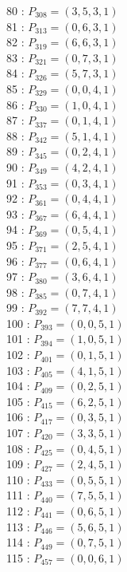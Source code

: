 \documentclass{article}
\begin{document}
{\begin{multicols}{3}
80 : $P_{308}=( 3, 5, 3, 1 )$\\
81 : $P_{313}=( 0, 6, 3, 1 )$\\
82 : $P_{319}=( 6, 6, 3, 1 )$\\
83 : $P_{321}=( 0, 7, 3, 1 )$\\
84 : $P_{326}=( 5, 7, 3, 1 )$\\
85 : $P_{329}=( 0, 0, 4, 1 )$\\
86 : $P_{330}=( 1, 0, 4, 1 )$\\
87 : $P_{337}=( 0, 1, 4, 1 )$\\
88 : $P_{342}=( 5, 1, 4, 1 )$\\
89 : $P_{345}=( 0, 2, 4, 1 )$\\
90 : $P_{349}=( 4, 2, 4, 1 )$\\
91 : $P_{353}=( 0, 3, 4, 1 )$\\
92 : $P_{361}=( 0, 4, 4, 1 )$\\
93 : $P_{367}=( 6, 4, 4, 1 )$\\
94 : $P_{369}=( 0, 5, 4, 1 )$\\
95 : $P_{371}=( 2, 5, 4, 1 )$\\
96 : $P_{377}=( 0, 6, 4, 1 )$\\
97 : $P_{380}=( 3, 6, 4, 1 )$\\
98 : $P_{385}=( 0, 7, 4, 1 )$\\
99 : $P_{392}=( 7, 7, 4, 1 )$\\
100 : $P_{393}=( 0, 0, 5, 1 )$\\
101 : $P_{394}=( 1, 0, 5, 1 )$\\
102 : $P_{401}=( 0, 1, 5, 1 )$\\
103 : $P_{405}=( 4, 1, 5, 1 )$\\
104 : $P_{409}=( 0, 2, 5, 1 )$\\
105 : $P_{415}=( 6, 2, 5, 1 )$\\
106 : $P_{417}=( 0, 3, 5, 1 )$\\
107 : $P_{420}=( 3, 3, 5, 1 )$\\
108 : $P_{425}=( 0, 4, 5, 1 )$\\
109 : $P_{427}=( 2, 4, 5, 1 )$\\
110 : $P_{433}=( 0, 5, 5, 1 )$\\
111 : $P_{440}=( 7, 5, 5, 1 )$\\
112 : $P_{441}=( 0, 6, 5, 1 )$\\
113 : $P_{446}=( 5, 6, 5, 1 )$\\
114 : $P_{449}=( 0, 7, 5, 1 )$\\
115 : $P_{457}=( 0, 0, 6, 1 )$\\

\end{multicols}}
\end{document}
